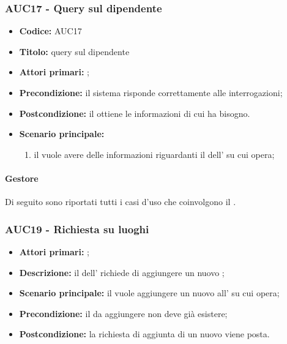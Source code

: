 \documentclass[casi-duso]{subfiles}
\begin{document}
\subsubsection{AUC17 - Query sul dipendente}
\label{subsub:AUC17}
\begin{itemize}
  \item \textbf{Codice:} AUC17
  \item \textbf{Titolo:} query sul dipendente
  \item \textbf{Attori primari:} ;
  \item \textbf{Precondizione:} il sistema risponde correttamente alle interrogazioni;
  \item \textbf{Postcondizione:} il  ottiene le informazioni di cui ha bisogno.
  \item \textbf{Scenario principale:}
  \begin{enumerate}
    \item il  vuole avere delle informazioni riguardanti il dell' su cui opera;
  \end{enumerate}
\end{itemize}

\paragraph{Gestore}
Di seguito sono riportati tutti i casi d'uso che coinvolgono il  .

\subsubsection{AUC19 - Richiesta su luoghi}
\label{subsub:AUC19}
\begin{itemize}
  \item \textbf{Attori primari:} ;
  \item \textbf{Descrizione:} il  dell' richiede di aggiungere un nuovo ;
  \item \textbf{Scenario principale:} il  vuole aggiungere un nuovo  all' su cui opera;
  \item \textbf{Precondizione:} il  da aggiungere non deve già esistere;
  \item \textbf{Postcondizione:} la richiesta di aggiunta di un nuovo  viene posta.
\end{itemize}
\end{document}
